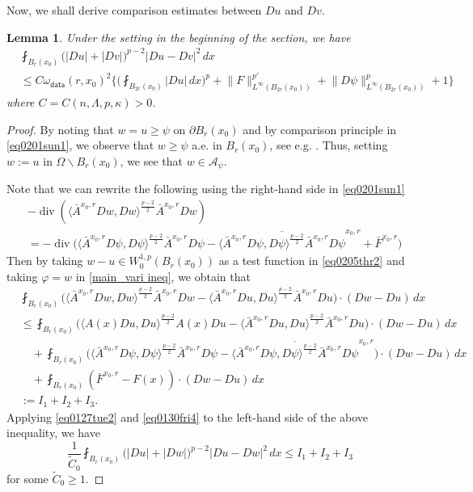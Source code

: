 \documentclass[reqno]{amsart}
\numberwithin{equation}{section}
\theoremstyle{plain}
\newtheorem{lemma}[theorem]{Lemma}
\theoremstyle{definition}
\theoremstyle{remark}
\DeclareMathOperator{\dv}{div}
\providecommand{\biggset}[1]{\biggl\{#1\biggr\}}
\providecommand{\abs}[1]{\lvert#1\rvert}
\providecommand{\ip}[1]{\langle#1\rangle}
\providecommand{\norm}[1]{\lVert#1\rVert}
\begin{document}
Now, we shall derive comparison estimates between $Du$ and $Dv$.
\begin{lemma}  \label{lemma0205thr1}
Under the setting in the beginning of the section, we have 
\begin{align*}
&\fint_{B_r(x_0)} \big(  \abs{Du}+\abs{Dv} \big)^{p-2}\abs{Du-Dv}^2 \,dx\\
&\leq C\omega_{\mathsf{data}}(r,x_0)^2\biggset{    \bigg(\fint_{B_{2r}(x_0)} \abs{Du} \,dx\bigg)^p +    \norm{F}_{L^\infty(B_{2r}(x_0))}
^{p'}+\norm{D\psi}_{L^\infty(B_{2r}(x_0))}^p +1      }
\end{align*}
where $C=C(n,\Lambda,p,\kappa)>0$. 
\end{lemma}
\begin{proof}
By noting that $w=u\geq \psi$ on $\partial B_r(x_0)$ and by comparison principle in \eqref{eq0201sun1},  we observe that $w\geq \psi $ a.e. in $B_r(x_0)$, see e.g. \cite[Lemma 3.5]{BCW12}. Thus, setting $w:=u$ in $\Omega\backslash B_r(x_0)$, we see that $w\in \mathcal{A}_\psi$.
 
Note that we can rewrite the following using the right-hand side in \eqref{eq0201sun1}
\begin{equation}   \label{eq0205thr2}
\begin{split}
&-\dv ( \ip{\bar{A}^{x_0,r}Dw, Dw }^{\frac{p-2}{2}} \bar{A}^{x_0,r} Dw)\\
&=- \dv \bigg( \ip{\bar{A}^{x_0,r} D\psi, D\psi }^{\frac{p-2}{2}} \bar{A}^{x_0,r} D\psi - \overline{\ip{\bar{A}^{x_0,r}D\psi, D\psi}^{\frac{p-2}{2}} \bar{A}^{x_0,r} D\psi}^{x_0,r}+\bar{F}^{x_0,r}\bigg) 
\end{split}
\end{equation}
Then by taking $w-u\in W^{1,p}_0(B_r(x_0))$ as a test function in \eqref{eq0205thr2} and taking $\varphi=w$ in \eqref{main_vari ineq}, we obtain that
\begin{align*}
& \fint_{B_r(x_0)} \big( \ip{ \bar{A}^{x_0,r}  Dw,Dw}^{\frac{p-2}{2}} \bar{A}^{x_0,r} Dw -\ip{ \bar{A}^{x_0,r}  Du,Du}^{\frac{p-2}{2}} \bar{A}^{x_0,r} Du \big) \cdot (Dw-Du) \,dx \\
& \leq \fint_{B_r(x_0)} \big( \ip{ A(x) Du,Du}^{\frac{p-2}{2}} A(x) Du -\ip{ \bar{A}^{x_0,r}  Du,Du}^{\frac{p-2}{2}} \bar{A}^{x_0,r} Du \big) \cdot (Dw-Du) \,dx 
\\ &\quad  + \fint_{B_r(x_0)}  \bigg( \ip{ \bar{A}^{x_0,r} D\psi,D\psi}^{\frac{p-2}{2}} \bar{A}^{x_0,r} D\psi   -\overline{\ip{\bar{A}^{x_0,r}D\psi, D\psi}^{\frac{p-2}{2}} \bar{A}^{x_0,r} D\psi}^{x_0,r} \bigg) \cdot  (Dw-Du)\, dx
\\ &\quad  + \fint_{B_r(x_0)} (\bar{F}^{x_0,r}-F(x)) \cdot  (Dw-Du) \,dx
\\ & :=I_1+I_2+I_3.
\end{align*}
Applying \eqref{eq0127tue2} and \eqref{eq0130fri4} to the left-hand side of the above inequality, we have
\begin{equation} \label{eq0304wed1}
\frac{1}{\tilde C_0}\fint_{B_r(x_0)} \big(  \abs{Du}+\abs{Dw} \big)^{p-2}\abs{Du-Dw}^2 \,dx\leq I_1+I_2+I_3
\end{equation}
for some $\tilde C_0\ge 1$.


\end{proof}
\end{document}
